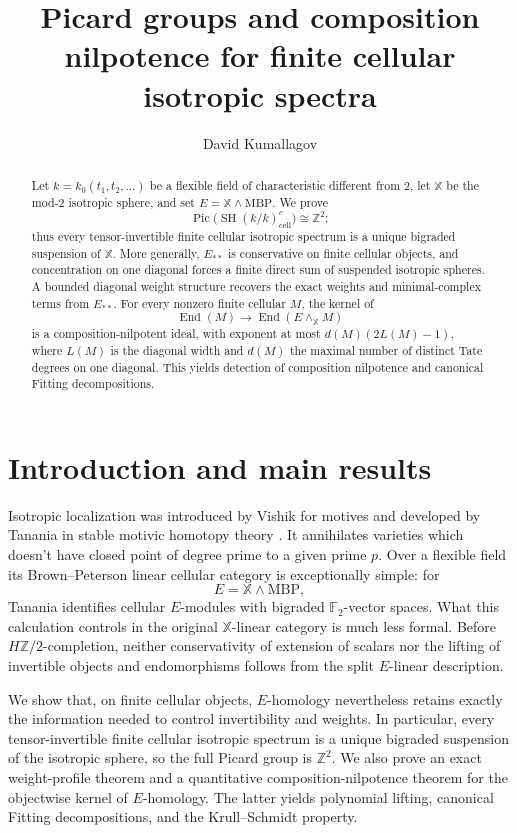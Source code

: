 \documentclass[11pt]{amsart}
\title[Picard groups and composition nilpotence]
{Picard groups and composition nilpotence for finite cellular isotropic
spectra}
\author{David Kumallagov}
\date{}
\numberwithin{equation}{section}
\theoremstyle{definition}
\theoremstyle{remark}
\DeclareMathOperator{\Pic}{Pic}
\DeclareMathOperator{\End}{End}
\DeclareMathOperator{\SH}{SH}
\newcommand{\MBP}{\mathrm{MBP}}
\newcommand{\F}{\mathbb F_2}
\newcommand{\X}{\mathbb X}
\newcommand{\cell}{\mathrm{cell}}
\begin{document}
\begin{abstract}
Let $k=k_0(t_1,t_2,\ldots)$ be a flexible field of characteristic different
from $2$, let $\X$ be the mod-$2$ isotropic sphere, and set
$E=\X\wedge\MBP$.  We prove
\[
  \Pic\bigl(\SH(k/k)^c_{\cell}\bigr)\cong\mathbb Z^2;
\]
thus every tensor-invertible finite cellular isotropic spectrum is a unique
bigraded suspension of $\X$.  More generally, $E_{**}$ is conservative on
finite cellular objects, and concentration on one diagonal forces a finite
direct sum of suspended isotropic spheres.  A bounded diagonal weight
structure recovers the exact weights and minimal-complex terms from
$E_{**}$.  For every nonzero finite cellular $M$, the kernel of
\[
  \End(M)\longrightarrow\End(E\wedge_{\X}M)
\]
is a composition-nilpotent ideal, with exponent at most
$d(M)(2L(M)-1)$, where $L(M)$ is the diagonal width and $d(M)$ the maximal
number of distinct Tate degrees on one diagonal.  This yields detection of
composition nilpotence and canonical Fitting decompositions.  
\end{abstract}

\maketitle

\section{Introduction and main results}\label{sec:introduction}

Isotropic localization was introduced by Vishik for motives \cite{VishikIsotropic} and developed by
Tanania in stable motivic homotopy theory
\cite{TananiaStable,TananiaCellular}.  It annihilates
varieties which doesn’t have closed point of degree prime to a given prime $p.$ Over a flexible field its
Brown--Peterson linear cellular category is exceptionally simple: for
\[
  E=\X\wedge\MBP,
\]
Tanania identifies cellular $E$-modules with bigraded $\F$-vector spaces.
What this calculation controls in the original $\X$-linear category is much
less formal.  Before $H\mathbb Z/2$-completion, neither conservativity of
extension of scalars nor the lifting of invertible objects and endomorphisms
follows from the split $E$-linear description.

We show that, on finite cellular objects, $E$-homology nevertheless retains
exactly the information needed to control invertibility and weights.  In
particular, every tensor-invertible finite cellular isotropic spectrum is a
unique bigraded suspension of the isotropic sphere, so the full Picard group
is $\mathbb Z^2$.  We also prove an exact weight-profile theorem and a
quantitative composition-nilpotence theorem for the objectwise kernel of
$E$-homology.  The latter yields polynomial lifting, canonical Fitting
decompositions, and the Krull--Schmidt property.
\end{document}
